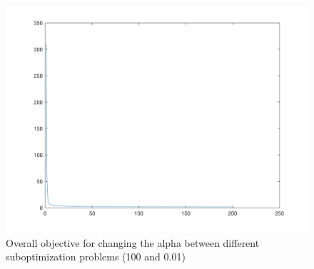 \documentclass{article}
\newcommand{\0}{\mathrm{0}}
\newcommand{\1}{\mathrm{1}}
\begin{document}
\begin{figure}[H]
    \includegraphics[width=\textwidth]{PGD_vary_mult5000.png}
    \caption{Overall objective for changing the alpha between different suboptimization problems (100 and 0.01)}
\end{figure}
\end{document}
